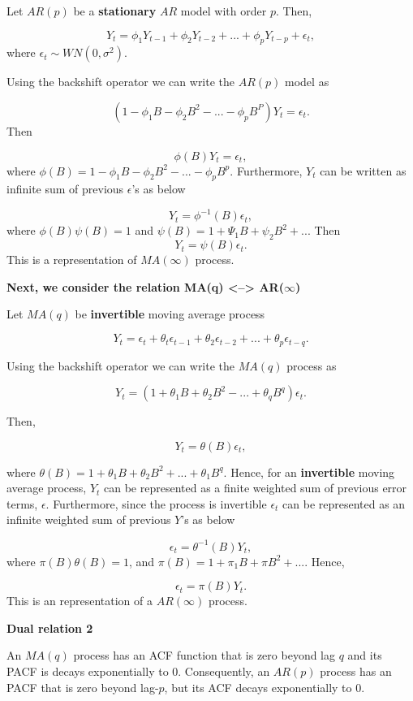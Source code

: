 \documentclass[
  11pt,
  a4paper,
]{report}
\begin{document}
Let \(AR(p)\) be a \textbf{stationary} \(AR\) model with order \(p\).
Then,

\[Y_t = \phi_1Y_{t-1}+ \phi_2Y_{t-2}+...+ \phi_pY_{t-p}+\epsilon_t,\]
where \(\epsilon_t \sim WN(0, \sigma^2).\)

Using the backshift operator we can write the \(AR(p)\) model as

\[(1-\phi_1B-\phi_2B^2-...-\phi_pB^P)Y_t=\epsilon_t.\] Then

\[\phi(B)Y_t=\epsilon_t,\] where
\(\phi(B)=1-\phi_1B-\phi_2B^2-...-\phi_pB^p.\) Furthermore, \(Y_t\) can
be written as infinite sum of previous \(\epsilon\)'s as below

\[Y_t = \phi^{-1}(B)\epsilon_t,\] where \(\phi(B)\psi(B)=1\) and
\(\psi(B)=1+\Psi_1B+\psi_2B^2+...\) Then \[Y_t=\psi(B)\epsilon_t.\] This
is a representation of \(MA(\infty)\) process.

\textbf{Next, we consider the relation MA(q) \textless--\textgreater{}
AR(}\(\infty\)\textbf{)}

Let \(MA(q)\) be \textbf{invertible} moving average process

\[Y_t = \epsilon_t + \theta_t\epsilon_{t-1}+\theta_2\epsilon_{t-2}+...+\theta_p\epsilon_{t-q}.\]

Using the backshift operator we can write the \(MA(q)\) process as

\[Y_t = (1+\theta_1B+\theta_2B^2-...+\theta_qB^q)\epsilon_t.\]

Then,

\[Y_t = \theta(B)\epsilon_t,\]

where \(\theta(B)=1+\theta_1B+\theta_2B^2+...+\theta_1B^q.\) Hence, for
an \textbf{invertible} moving average process, \(Y_t\) can be
represented as a finite weighted sum of previous error terms,
\(\epsilon\). Furthermore, since the process is invertible
\(\epsilon_t\) can be represented as an infinite weighted sum of
previous \(Y\)'s as below

\[\epsilon_t=\theta^{-1}(B)Y_t,\] where \(\pi(B)\theta(B)=1\), and
\(\pi(B) = 1+\pi_1B+\pi B^2+...\). Hence,

\[\epsilon_t = \pi(B)Y_t.\] This is an representation of a
\(AR(\infty)\) process.

\textbf{Dual relation 2}

An \(MA(q)\) process has an ACF function that is zero beyond lag \(q\)
and its PACF is decays exponentially to 0. Consequently, an \(AR(p)\)
process has an PACF that is zero beyond lag-\(p\), but its ACF decays
exponentially to 0.
\end{document}
